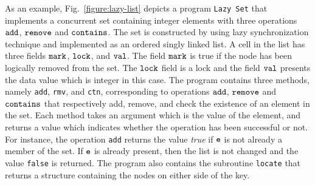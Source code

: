 %
%
%


As an example, Fig.~\ref{figure:lazy-list} depicts a program
{\tt Lazy Set} \cite{Lazyset}
that implements a concurrent set containing integer
elements with three operations $\tt add$, $\tt remove$ and $\tt contains$.
%
The set is constructed by using lazy synchronization technique and  implemented as an ordered singly linked list. A cell in the list has three fields ${\tt mark}$, ${\tt lock}$, and
${\tt val}$. The field $\tt mark$ is true if
the node has been logically removed from the set. The ${\tt lock}$ field is a lock and the field ${\tt val}$ presents the data value which is integer in this case.
The program contains three methods, namely {\tt add}, {\tt rmv},
and {\tt ctn},  corresponding to operations $\tt add$, $\tt remove$ and $\tt contains$
that respectively add, remove, and check the existence
of an element in the set. Each method takes an argument which is the value of the element, and returns a value which indicates whether
the operation has been successful or not. For instance, the operation {\tt add} returns the value
{\it true} if  $\tt e$ is not already a member of the set. If $\tt e$ is already present, then the list is not changed and the value {\tt false} is returned.
% 
The program also contains the subroutine {\tt locate} that returns a structure containing the nodes on either side of the key.
%

